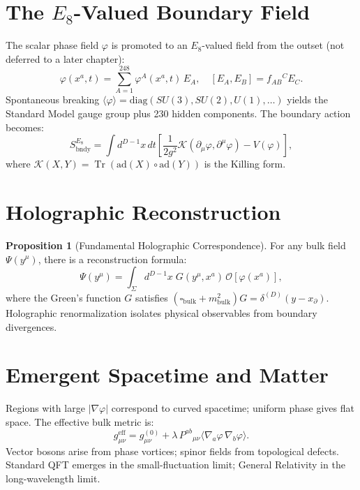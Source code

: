 \documentclass[12pt,oneside]{book}
\theoremstyle{definition}
\newtheorem{proposition}{Proposition}[chapter]
\newcommand{\EEight}{E_8}
\DeclareMathOperator{\Tr}{Tr}
\begin{document}
\section{The $E_8$-Valued Boundary Field}

The scalar phase field $\varphi$ is promoted to an $\EEight$-valued field
from the outset (not deferred to a later chapter):
\begin{equation}
  \label{eq:e8-field}
  \varphi(x^a, t) = \sum_{A=1}^{248} \varphi^A(x^a, t)\,E_A,
  \quad [E_A, E_B] = f_{AB}{}^C E_C.
\end{equation}
Spontaneous breaking $\langle\varphi\rangle = \mathrm{diag}(SU(3), SU(2), U(1),
\ldots)$ yields the Standard Model gauge group plus 230 hidden components. The
boundary action becomes:
\begin{equation}
  S^{E_8}_{\mathrm{bndy}}
  = \int d^{D-1}x\,dt\left[
    \frac{1}{2g^2}\mathcal{K}(\partial_\mu\varphi, \partial^\mu\varphi) - V(\varphi)
  \right],
\end{equation}
where $\mathcal{K}(X,Y) = \Tr(\mathrm{ad}(X)\circ\mathrm{ad}(Y))$ is the Killing form.

\section{Holographic Reconstruction}

\begin{proposition}[Fundamental Holographic Correspondence]
  For any bulk field $\Psi(y^\mu)$, there is a reconstruction formula:
  \begin{equation}
    \Psi(y^\mu) = \int_\Sigma d^{D-1}x\;G(y^\mu, x^a)\,\mathcal{O}[\varphi(x^a)],
  \end{equation}
  where the Green's function $G$ satisfies
  $(\square_{\mathrm{bulk}} + m^2_{\mathrm{bulk}})G = \delta^{(D)}(y - x_\partial)$.
  Holographic renormalization \citep{Skenderis2002} isolates physical observables
  from boundary divergences.
\end{proposition}

\section{Emergent Spacetime and Matter}

Regions with large $|\nabla\varphi|$ correspond to curved spacetime; uniform
phase gives flat space. The effective bulk metric is:
\begin{equation}
  g^{\mathrm{eff}}_{\mu\nu}
  = g^{(0)}_{\mu\nu}
  + \lambda\,P^{ab}{}_{\mu\nu}\langle\nabla_a\varphi\,\nabla_b\varphi\rangle.
\end{equation}
Vector bosons arise from phase vortices; spinor fields from topological defects.
Standard QFT emerges in the small-fluctuation limit; General Relativity in the
long-wavelength limit.
\end{document}
